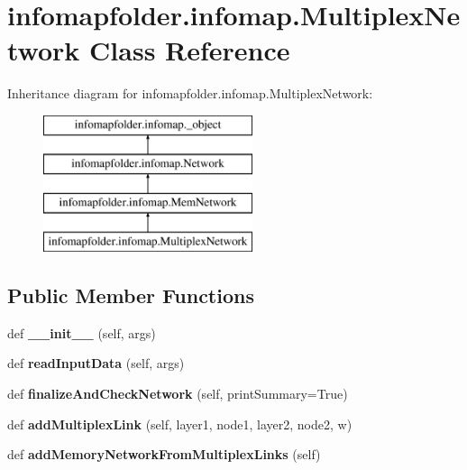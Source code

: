 \hypertarget{classinfomapfolder_1_1infomap_1_1MultiplexNetwork}{}\section{infomapfolder.\+infomap.\+Multiplex\+Network Class Reference}
\label{classinfomapfolder_1_1infomap_1_1MultiplexNetwork}
Inheritance diagram for infomapfolder.\+infomap.\+Multiplex\+Network\+:\begin{figure}[H]
\begin{center}
\leavevmode
\includegraphics[height=4.000000cm]{classinfomapfolder_1_1infomap_1_1MultiplexNetwork}
\end{center}
\end{figure}
\subsection*{Public Member Functions}
\begin{DoxyCompactItemize}
\item 
\mbox{\label{classinfomapfolder_1_1infomap_1_1MultiplexNetwork_a81c1c7a991658bef8ca6e1768ce7debc}} 
def {\bfseries \+\_\+\+\_\+init\+\_\+\+\_\+} (self, args)
\item 
\mbox{\label{classinfomapfolder_1_1infomap_1_1MultiplexNetwork_aea5c360b19022f4c6eb9c14201177311}} 
def {\bfseries read\+Input\+Data} (self, args)
\item 
\mbox{\label{classinfomapfolder_1_1infomap_1_1MultiplexNetwork_a1c6c2752e9612438fe81da5f05220fb9}} 
def {\bfseries finalize\+And\+Check\+Network} (self, print\+Summary=True)
\item 
\mbox{\label{classinfomapfolder_1_1infomap_1_1MultiplexNetwork_a59ef35c9f353a62239f73174078ac311}} 
def {\bfseries add\+Multiplex\+Link} (self, layer1, node1, layer2, node2, w)
\item 
\mbox{\label{classinfomapfolder_1_1infomap_1_1MultiplexNetwork_a4bd4e1470c89a1d09251c97cfba91fb9}} 
def {\bfseries add\+Memory\+Network\+From\+Multiplex\+Links} (self)
\end{DoxyCompactItemize}
